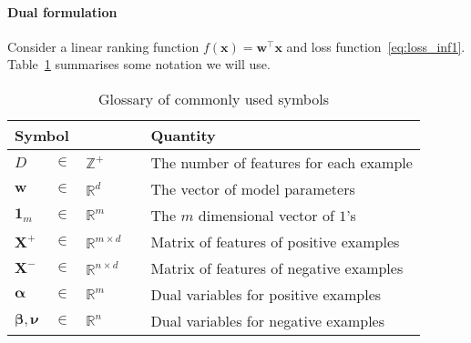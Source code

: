 \documentclass[9pt]{extarticle}
\newcommand{\x}{\mathbf{x}}
\newcommand{\X}{\mathbf{X}}
\newcommand{\1}{\mathbf{1}}
\newcommand{\w}{\mathbf{w}}
\newcommand{\R}{\mathbb{R}}
\newcommand{\Z}{\mathbb{Z}}
\newcommand{\alphabm}{\bm{\alpha}}
\newcommand{\betabm}{\bm{\beta}}
\newcommand{\nubm}{\bm{\nu}}
\begin{document}
\paragraph{Dual formulation}
Consider a linear ranking function $f(\x) = \w^\top \x$ and loss function~\ref{eq:loss_inf1}.
Table~\ref{tab:symbol} summarises some notation we will use.
\begin{table}[!h]
\caption{Glossary of commonly used symbols}
\label{tab:symbol}
\renewcommand{\arraystretch}{1.5} %
\setlength{\tabcolsep}{1pt} %
\centering
\begin{tabular}{llll}
\hline \hline
\multicolumn{3}{l}{\textbf{Symbol}} & \textbf{Quantity} \\ \hline 
$D$              &  $\in$  &  $\Z^+$  & The number of features for each example \\
$\w$             &  $\in$  &  $\R^d$  & The vector of model parameters \\
$\mathbf{1}_m$   &  $\in$  &  $\R^m$  & The $m$ dimensional vector of $1$'s \\
$\X^+$           &  $\in$  &  $\R^{m \times d}\quad$  & Matrix of features of positive examples \\
$\X^-$           &  $\in$  &  $\R^{n \times d}$       & Matrix of features of negative examples \\
$\alphabm$       &  $\in$  &  $\R^m$  &  Dual variables for positive examples \\
$\betabm, \nubm$ &  $\in$  &  $\R^n$  &  Dual variables for negative examples \\ \hline
\end{tabular}
\end{table}
\end{document}
